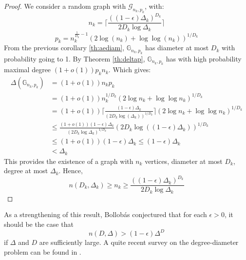 \begin{proof}
	We consider a random graph with $\mathcal{G}_{n_k, p_k}$, with:
	\begin{equation}
		n_k = \lceil \frac{((1-\epsilon)\Delta_k)^{D_k}}{2D_k\log \Delta_k} \rceil
	\end{equation}
	\begin{equation}
		p_k = n_k^{\frac{1}{D_k} -1 }(2\log(n_k) + \log\log(n_k))^{1/D_k}
	\end{equation}
	From the previous corollary \eqref{th:aediam}, $\mathbb{G}_{n_k, p_k}$ has diameter at most $D_k$ with probability going to 1.
	By Theorem \eqref{th:deltap}, $\mathbb{G}_{n_k,p_k}$ has with high probability maximal degree $(1+o(1))p_kn_k$.
	Which gives:
	\begin{align}
		\Delta(\mathbb{G}_{n_k,p_k}) 	&=(1+o(1))n_kp_k \\
						&= (1+o(1))n_k^{1/D_k}(2\log n_k + \log\log n_k)^{1/D_k}	\\
						&= (1+o(1))\lceil{\frac{(1-\epsilon)\Delta_k}{(2D_k\log(\Delta_k))^{1/D_k}}}\rceil(2\log n_k +  \log\log n_k)^{1/D_k}\\	
						&\leq \frac{(1+o(1))(1-\epsilon) \Delta_k}{(2D_k \log\Delta_k)^{1/D_k}} (2D_k\log((1-\epsilon)\Delta_k))^{1/D_k} \\   
						&\leq (1+o(1))(1-\epsilon)\Delta_k \leq (1-\epsilon)\Delta_k \\
						&< \Delta_k	
	\end{align}	
	This provides the existence of a graph with $n_k$ vertices, diameter at most $D_k$, degree at most $\Delta_k$.
	Hence,
	\begin{equation}
		n(D_k, \Delta_k)\geq n_k \geq \frac{((1-\epsilon)\Delta_k)^{D_k}}{2D_k\log \Delta_k} 
	\end{equation}
\end{proof}
As a strengthening of this result, Bollob\'as \cite{BollobExtr} conjectured that for each $\epsilon > 0$, it should be the case that $$n(D, \Delta) > (1-\epsilon)\Delta^D$$ if $\Delta$ and $D$ are sufficiently large.
\newline
A quite recent survey on the degree-diameter problem can be found in \cite{degreeDiam}.

